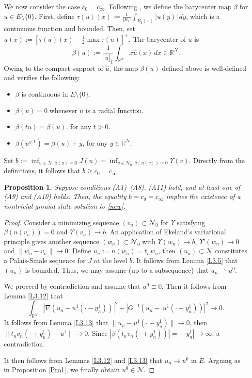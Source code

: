 \documentclass[10pt,a4paper]{amsart}
\numberwithin{equation}{section}
\newtheorem{proposition}[theorem]{Proposition}
\begin{document}
We now consider the case \( c_0 = c_\infty \). Following \cite{Ambrosetti, Cerami}, 
we define the barycenter map \( \beta \) for  \( u \in E\setminus\{0\} \). 
First, define \( \tau(u)(x) := \frac{1}{|B_1|} \int_{B_1(x)} |u(y)| \, dy \), which is a continuous 
function and bounded. Then, set \( \hat{u}(x) := \left[ \tau(u)(x) - \frac{1}{2} \max \tau(u) \right]^+\).
 The barycenter of \( u \) is 
 \[
\beta(u) := \frac{1}{|\hat{u}|_1} \int_{\mathbb{R}^N} x \hat{u}(x) \, dx \in \mathbb{R}^N.
 \]
Owing to the compact support of $\hat{u}$,  the map $\beta(u)$ defined above is well-defined 
and verifies the following:
\begin{itemize}
\item[(1)] $\beta$ is continuous in $ E\setminus\{0\}$.
\item[(2)] $\beta(u)=0$ whenever $u$ is a radial function.
\item[(3)] $\beta(t u) = \beta(u)$, for any $t > 0$.
\item[(4)] $\beta(u^{y,1})=\beta(u)+y$, for any  $y\in{\mathbb{R}^N}$.
\end{itemize}
Set $b:=\inf_{u\in\mathcal{N},\beta(u)=0}J(u)=\inf_{v\in \mathcal{N}_0,\beta(n(v))=0}\Upsilon (v)$. Directly from the definitions, it follows that  $b\geq c_0=c_\infty$.

\begin{proposition} \label{Pro2} 
Suppose conditions  {\rm (A1)--(A8), (A11) } hold, and at least one of {\rm (A9) }and {\rm (A10) }
 holds. Then,  the equality $b=c_0=c_\infty$ implies the existence of a nontrivial ground state solution to \eqref{new}.
\end{proposition}

\begin{proof}
Consider a minimizing sequence $(v_n)\subset \mathcal{N}_0$  for $\Upsilon$ satisfying 
$\beta(n(v_n))=0$ and $\Upsilon(v_n)\to b$. An application of Ekeland’s variational principle 
gives another sequence  $(w_n)\subset \mathcal{N}_0$ with $\Upsilon(w_n)\to b$, 
$\Upsilon'(w_n)\to 0$ and $\|w_n-v_n\|\to0$. Define $u_n:=n(w_n)=t_nw_n$, then 
$(u_n)\subset\mathcal{N}$ constitutes a Palais-Smale sequence for $J$ at the level $b$. 
It follows from Lemma \ref{L3.5} that \( (u_n) \) is bounded. Thus, we may assume (up to a subsequence) that \( u_n \rightharpoonup u^0 \).

We proceed by contradiction and assume that \( u^0 \equiv 0 \). 
Then it follows from Lemma \ref{L3.12} that
$$
\int_{\mathbb{R}^N} \left|\nabla \left(u_n  -  u^1(\cdot - y_n^1)\right)\right|^2 
+ \left|G^{-1}\left(u_n  - \ u^1(\cdot - y_n^1)\right)\right|^2\to 0.
$$
It follows from Lemma \ref{L3.13}  that $\|u_n-u^1(\cdot-y_n^1)\|\to0$, then 
$\|t_nv_n(\cdot+y_n^1)-u^1\|\to0$. Since $|\beta(t_nv_n(\cdot+y_n^1))|=|-y_n^1|\to\infty$, 
a contradiction.

It then follows from Lemmas \ref{L3.12} and \ref{L3.13} that \( u_n \to u^0 \) in \( E \). 
Arguing as in Proposition \ref{Pro1}, we finally obtain $u^0\in\mathcal{N}$.
\end{proof}
\end{document}
